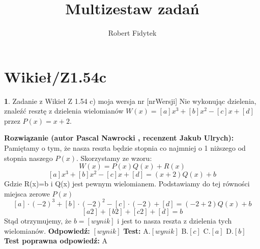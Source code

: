 \documentclass[12pt, a4paper]{article}
\title{Multizestaw zadań}
\author{Robert Fidytek}
\date{}
\theoremstyle{definition} %
\newtheorem{zad}{}
\newcommand{\kategoria}[1]{\section{#1}} %
\newcommand{\zadStart}[1]{\begin{zad}#1\newline} %
\newcommand{\zadStop}{\end{zad}}   %
\newcommand{\rozwStart}[2]{\noindent \textbf{Rozwiązanie (autor #1 , recenzent #2): }\newline} %
\newcommand{\odpStart}{\noindent \textbf{Odpowiedź:}\newline}    %
\newcommand{\odpStop}{\newline}                                             %
\newcommand{\testStart}{\noindent \textbf{Test:}\newline} %
\newcommand{\testStop}{\newline} %
\newcommand{\kluczStart}{\noindent \textbf{Test poprawna odpowiedź:}\newline} %
\newcommand{\kluczStop}{\newline} %
\begin{document}
\maketitle
\kategoria{Wikieł/Z1.54c}
\zadStart{Zadanie z Wikieł Z 1.54 c) moja wersja nr [nrWersji]}
Nie wykonując dzielenia, znaleźć resztę z dzielenia wielomianów $W(x)=[a]x^3+[b]x^2-[c]x+[d]$ przez $P(x)=x+2$.
\zadStop
\rozwStart{Pascal Nawrocki}{Jakub Ulrych}
Pamiętamy o tym, że nasza reszta będzie stopnia co najmniej o 1 niższego od stopnia naszego $P(x)$. Skorzystamy ze wzoru:
$$W(x)=P(x)Q(x)+R(x)$$
$$[a]x^3+[b]x^2-[c]x+[d]=(x+2)Q(x)+b$$
Gdzie R(x)=b i Q(x) jest pewnym wielomianem. Podstawiamy do tej równości miejsca zerowe $P(x)$
$$[a]\cdot(-2)^3+[b]\cdot(-2)^2-[c]\cdot(-2)+[d]=(-2+2)Q(x)+b$$
$$[a2]+[b2]+[c2]+[d]=b$$
Stąd otrzymujemy, że $b=[wynik]$ i jest to nasza reszta z dzielenia tych wielomianów.
\odpStart
$[wynik]$
\odpStop
\testStart
A.$[wynik]$
B.$[c]$
C.$[a]$
D.$[b]$
\testStop
\kluczStart
A
\kluczStop
\end{document}
